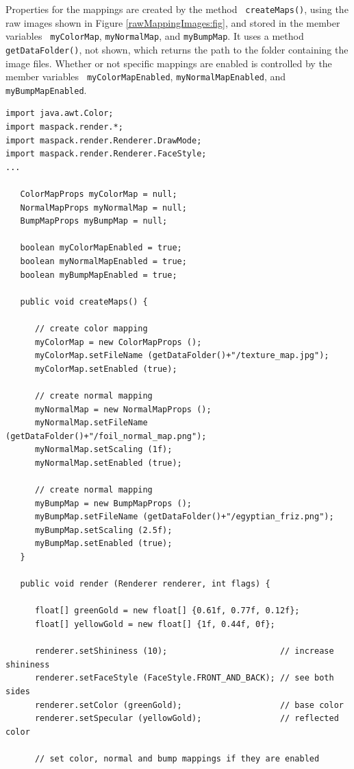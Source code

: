 Properties for the mappings are created by the method {\tt
createMaps()}, using the raw images shown in Figure
\ref{rawMappingImages:fig}, and stored in the member variables {\tt
myColorMap}, {\tt myNormalMap}, and {\tt myBumpMap}.  It uses
a method {\tt getDataFolder()}, not shown, which returns the path to
the folder containing the image files.  Whether or not specific
mappings are enabled is controlled by the member variables {\tt
myColorMapEnabled}, {\tt myNormalMapEnabled}, and {\tt
myBumpMapEnabled}.
%
\begin{lstlisting}[caption={Rendering code to set up color, normal and
bump maps.},
label=renderMapping:lst]
import java.awt.Color;
import maspack.render.*;
import maspack.render.Renderer.DrawMode;
import maspack.render.Renderer.FaceStyle;
...

   ColorMapProps myColorMap = null;
   NormalMapProps myNormalMap = null;
   BumpMapProps myBumpMap = null;

   boolean myColorMapEnabled = true;
   boolean myNormalMapEnabled = true;
   boolean myBumpMapEnabled = true;

   public void createMaps() {

      // create color mapping
      myColorMap = new ColorMapProps ();
      myColorMap.setFileName (getDataFolder()+"/texture_map.jpg");
      myColorMap.setEnabled (true);         

      // create normal mapping
      myNormalMap = new NormalMapProps ();
      myNormalMap.setFileName (getDataFolder()+"/foil_normal_map.png");
      myNormalMap.setScaling (1f);
      myNormalMap.setEnabled (true);         

      // create normal mapping
      myBumpMap = new BumpMapProps ();
      myBumpMap.setFileName (getDataFolder()+"/egyptian_friz.png");
      myBumpMap.setScaling (2.5f);
      myBumpMap.setEnabled (true);         
   }

   public void render (Renderer renderer, int flags) {

      float[] greenGold = new float[] {0.61f, 0.77f, 0.12f};
      float[] yellowGold = new float[] {1f, 0.44f, 0f};

      renderer.setShininess (10);                       // increase shininess
      renderer.setFaceStyle (FaceStyle.FRONT_AND_BACK); // see both sides
      renderer.setColor (greenGold);                    // base color
      renderer.setSpecular (yellowGold);                // reflected color

      // set color, normal and bump mappings if they are enabled


\end{lstlisting}
